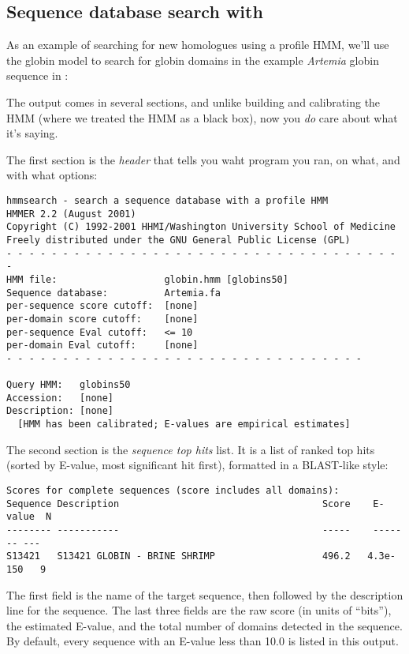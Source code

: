 \subsection{Sequence database search with }

As an example of searching for new homologues using a profile HMM,
we'll use the globin model to search for globin domains in the example
{\em Artemia} globin sequence in :

\vspace{1.5em}

The output comes in several sections, and unlike building and
calibrating the HMM (where we treated the HMM as a black box), now you
{\em do} care about what it's saying.

The first section is the {\em header} that tells you waht program you
ran, on what, and with what options:

{\small\begin{verbatim}
hmmsearch - search a sequence database with a profile HMM
HMMER 2.2 (August 2001)
Copyright (C) 1992-2001 HHMI/Washington University School of Medicine
Freely distributed under the GNU General Public License (GPL)
- - - - - - - - - - - - - - - - - - - - - - - - - - - - - - - - - - - -
HMM file:                   globin.hmm [globins50]
Sequence database:          Artemia.fa
per-sequence score cutoff:  [none]
per-domain score cutoff:    [none]
per-sequence Eval cutoff:   <= 10        
per-domain Eval cutoff:     [none]
- - - - - - - - - - - - - - - - - - - - - - - - - - - - - - - -

Query HMM:   globins50
Accession:   [none]
Description: [none]
  [HMM has been calibrated; E-values are empirical estimates]
\end{verbatim}}

The second section is the {\em sequence top hits} list. It is a list
of ranked top hits (sorted by E-value, most significant hit first),
formatted in a BLAST-like style:

{\small\begin{verbatim}
Scores for complete sequences (score includes all domains):
Sequence Description                                    Score    E-value  N 
-------- -----------                                    -----    ------- ---
S13421   S13421 GLOBIN - BRINE SHRIMP                   496.2   4.3e-150   9
\end{verbatim}}

The first field is the name of the target sequence, then followed by
the description line for the sequence. The last three fields are the
raw score (in units of ``bits''), the estimated E-value, and the total
number of domains detected in the sequence.  By default, every
sequence with an E-value less than 10.0 is listed in this output.

